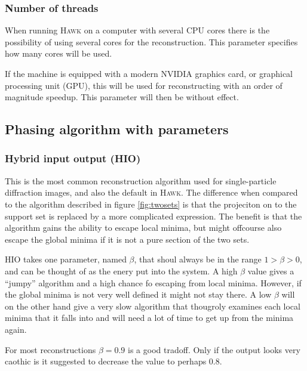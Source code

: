 \documentclass[11pt,a4paper]{article}
\newcommand{\hawk}[1]{\textsc{#1}}
\begin{document}
\subsubsection{Number of threads}
When running \hawk{Hawk} on a computer with several CPU cores there is the possibility of using several cores for the reconstruction. This parameter specifies how many cores will be used.

If the machine is equipped with a modern NVIDIA graphics card, or graphical processing unit (GPU), this will be used for reconstructing with an order of magnitude speedup. This parameter will then be without effect.

\subsection{Phasing algorithm with parameters}
\subsubsection{Hybrid input output (HIO)}
This is the most common reconstruction algorithm used for single-particle diffraction images, and also the default in \hawk{Hawk}. The difference when compared to the algorithm described in figure \ref{fig:twosets} is that the projeciton on to the support set is replaced by a more complicated expression. The benefit is that the algorithm gains the ability to escape local minima, but might offcourse also escape the global minima if it is not a pure section of the two sets.

HIO takes one parameter, named $\beta$, that shoul always be in the range $1 > \beta > 0$, and can be thought of as the enery put into the system. A high $\beta$ value gives a ``jumpy'' algorithm and a high chance fo escaping from local minima. However, if the global minima is not very well defined it might not stay there. A low $\beta$ will on the other hand give a very slow algorithm that thougroly examines each local minima that it falls into and will need a lot of time to get up from the minima again.

For most reconstructions $\beta = 0.9$ is a good tradoff. Only if the output looks very caothic is it suggested to decrease the value to perhaps $0.8$.
\end{document}
